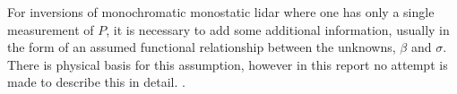 For inversions of monochromatic monostatic lidar
where one has only a single measurement of $P$, it
is necessary to add some additional information, usually in
the form of an assumed  
functional relationship between the unknowns,
$\beta$ and $\sigma$. 
There is physical basis for 
this assumption, however in this report no attempt 
is made to describe this in detail. \cite{jdk1}.
%
%

% 

